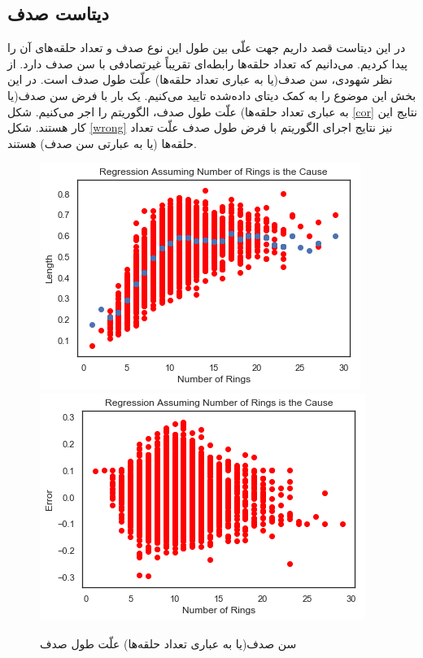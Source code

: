 \documentclass[papersize=a4]{report}
\begin{document}
\subsection{دیتاست صدف}
در این دیتاست قصد داریم جهت علّی بین طول این نوع صدف و تعداد حلقه‌های آن را پیدا کردیم. می‌دانیم که تعداد حلقه‌ها رابطه‌ای تقریباً غیرتصادفی با سن  صدف دارد. از نظر شهودی،‌ سن صدف(یا به عباری تعداد حلقه‌ها) علّت طول صدف است. در این بخش این موضوع را به کمک دیتای داده‌شده تایید می‌کنیم.
یک بار با فرض سن صدف(یا به عباری تعداد حلقه‌ها) علّت طول صدف، الگوریتم را اجر می‌کنیم. شکل 
\eqref{cor}
نتایج این کار هستند. شکل 
\eqref{wrong}
نیز نتایج اجرای الگوریتم با فرض طول صدف علّت تعداد حلقه‌ها (یا به عبارتی سن صدف) هستند.
\begin{figure}[h!]
	\centering
	\begin{floatrow}
		\includegraphics[scale=0.4]{aba_for1.png}
		\includegraphics[scale=0.4]{aba_for2.png}
	\end{floatrow}
\caption{ سن صدف(یا به عباری تعداد حلقه‌ها) علّت طول صدف}
\label{cor}
\end{figure}
\end{document}
